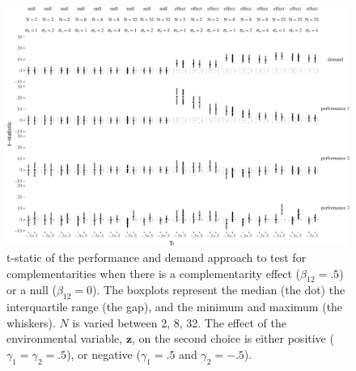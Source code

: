 \documentclass[12pt]{article}
\begin{document}
\begin{figure}

\includegraphics[width=500px]{figure-latex/unnamed-chunk-7-1}
\caption[Error Rate and Power with Increasing Levels of Variability in Performance]
{\label{noise} t-static of the performance and demand approach to test
for complementarities when there is a complementarity effect ($\beta_{12} = .5$)
or a null ($\beta_{12} = 0$). The boxplots represent the median (the dot) the
interquartile range (the gap), and the minimum and maximum (the whiskers). $N$
is varied between 2, 8, 32. The effect of the environmental
variable, $\mathbf{z}$, on the second choice is either positive
($\gamma_1 = \gamma_2 = .5$), or
negative ($\gamma_1 = .5$ and $\gamma_2 = -.5$).}
\end{figure}
\end{document}
